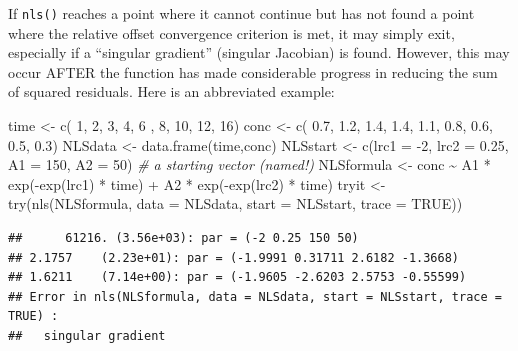 \documentclass[
]{article}
\newenvironment{Shaded}{\begin{snugshade}}{\end{snugshade}}
\newcommand{\AttributeTok}[1]{\textcolor[rgb]{0.77,0.63,0.00}{#1}}
\newcommand{\CommentTok}[1]{\textcolor[rgb]{0.56,0.35,0.01}{\textit{#1}}}
\newcommand{\ConstantTok}[1]{\textcolor[rgb]{0.00,0.00,0.00}{#1}}
\newcommand{\DecValTok}[1]{\textcolor[rgb]{0.00,0.00,0.81}{#1}}
\newcommand{\FloatTok}[1]{\textcolor[rgb]{0.00,0.00,0.81}{#1}}
\newcommand{\FunctionTok}[1]{\textcolor[rgb]{0.00,0.00,0.00}{#1}}
\newcommand{\NormalTok}[1]{#1}
\newcommand{\OtherTok}[1]{\textcolor[rgb]{0.56,0.35,0.01}{#1}}
\newcommand{\SpecialCharTok}[1]{\textcolor[rgb]{0.00,0.00,0.00}{#1}}
\begin{document}
If \texttt{nls()} reaches a point where it cannot continue but has not
found a point where the relative offset convergence criterion is met, it
may simply exit, especially if a ``singular gradient'' (singular
Jacobian) is found. However, this may occur AFTER the function has made
considerable progress in reducing the sum of squared residuals. Here is
an abbreviated example:

\begin{Shaded}
\begin{Highlighting}[]
\NormalTok{time }\OtherTok{\textless{}{-}} \FunctionTok{c}\NormalTok{( }\DecValTok{1}\NormalTok{,  }\DecValTok{2}\NormalTok{,  }\DecValTok{3}\NormalTok{,  }\DecValTok{4}\NormalTok{,  }\DecValTok{6}\NormalTok{ , }\DecValTok{8}\NormalTok{, }\DecValTok{10}\NormalTok{, }\DecValTok{12}\NormalTok{, }\DecValTok{16}\NormalTok{)}
\NormalTok{conc }\OtherTok{\textless{}{-}} \FunctionTok{c}\NormalTok{( }\FloatTok{0.7}\NormalTok{, }\FloatTok{1.2}\NormalTok{, }\FloatTok{1.4}\NormalTok{, }\FloatTok{1.4}\NormalTok{, }\FloatTok{1.1}\NormalTok{, }\FloatTok{0.8}\NormalTok{, }\FloatTok{0.6}\NormalTok{, }\FloatTok{0.5}\NormalTok{, }\FloatTok{0.3}\NormalTok{)}
\NormalTok{NLSdata }\OtherTok{\textless{}{-}} \FunctionTok{data.frame}\NormalTok{(time,conc)}
\NormalTok{NLSstart }\OtherTok{\textless{}{-}} \FunctionTok{c}\NormalTok{(}\AttributeTok{lrc1 =} \SpecialCharTok{{-}}\DecValTok{2}\NormalTok{, }\AttributeTok{lrc2 =} \FloatTok{0.25}\NormalTok{, }\AttributeTok{A1 =} \DecValTok{150}\NormalTok{, }\AttributeTok{A2 =} \DecValTok{50}\NormalTok{) }\CommentTok{\# a starting vector (named!)}
\NormalTok{NLSformula }\OtherTok{\textless{}{-}}\NormalTok{ conc }\SpecialCharTok{\textasciitilde{}}\NormalTok{ A1 }\SpecialCharTok{*} \FunctionTok{exp}\NormalTok{(}\SpecialCharTok{{-}}\FunctionTok{exp}\NormalTok{(lrc1) }\SpecialCharTok{*}\NormalTok{ time) }\SpecialCharTok{+}\NormalTok{ A2 }\SpecialCharTok{*} \FunctionTok{exp}\NormalTok{(}\SpecialCharTok{{-}}\FunctionTok{exp}\NormalTok{(lrc2) }\SpecialCharTok{*}\NormalTok{ time)}
\NormalTok{tryit }\OtherTok{\textless{}{-}} \FunctionTok{try}\NormalTok{(}\FunctionTok{nls}\NormalTok{(NLSformula, }\AttributeTok{data =}\NormalTok{ NLSdata, }\AttributeTok{start =}\NormalTok{ NLSstart, }\AttributeTok{trace =} \ConstantTok{TRUE}\NormalTok{))}
\end{Highlighting}
\end{Shaded}

\begin{verbatim}
##      61216. (3.56e+03): par = (-2 0.25 150 50)
## 2.1757    (2.23e+01): par = (-1.9991 0.31711 2.6182 -1.3668)
## 1.6211    (7.14e+00): par = (-1.9605 -2.6203 2.5753 -0.55599)
## Error in nls(NLSformula, data = NLSdata, start = NLSstart, trace = TRUE) : 
##   singular gradient
\end{verbatim}
\end{document}
